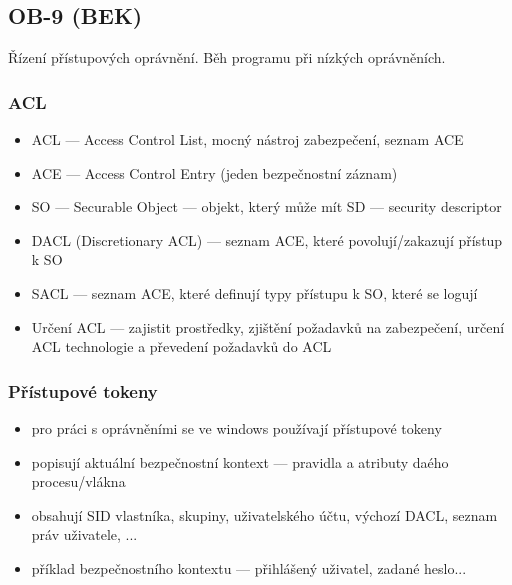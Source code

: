 \subsection{OB-9 (BEK)}
Řízení přístupových oprávnění. Běh programu při nízkých oprávněních.

\subsubsection*{ACL}
\begin{itemize}
    \item ACL --- Access Control List, mocný nástroj zabezpečení, seznam ACE
    \item ACE --- Access Control Entry (jeden bezpečnostní záznam)
    \item SO --- Securable Object --- objekt, který může mít SD --- security descriptor
    \item DACL (Discretionary ACL) --- seznam ACE, které povolují/zakazují přístup k SO
    \item SACL --- seznam ACE, které definují typy přístupu k SO, které se logují
    \item Určení ACL --- zajistit prostředky, zjištění požadavků na zabezpečení, určení ACL technologie a převedení požadavků do ACL
\end{itemize}

\subsubsection*{Přístupové tokeny}
\begin{itemize}
    \item pro práci s oprávněními se ve windows používají přístupové tokeny
    \item popisují aktuální bezpečnostní kontext --- pravidla a atributy daého procesu/vlákna
    \item obsahují SID vlastníka, skupiny, uživatelského účtu, výchozí DACL, seznam práv uživatele, ...
    \item příklad bezpečnostního kontextu --- přihlášený uživatel, zadané heslo...
    
\end{itemize}

